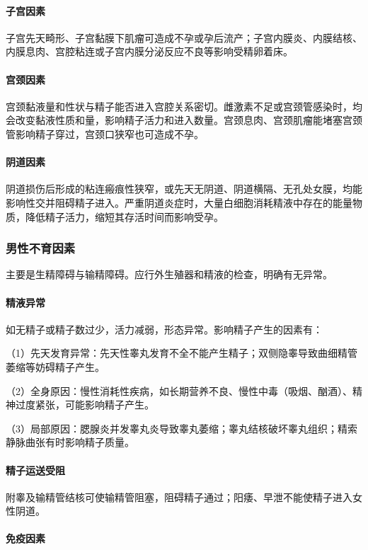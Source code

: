 \paragraph{子宫因素}

子宫先天畸形、子宫黏膜下肌瘤可造成不孕或孕后流产；子宫内膜炎、内膜结核、内膜息肉、宫腔粘连或子宫内膜分泌反应不良等影响受精卵着床。
\paragraph{宫颈因素}

宫颈黏液量和性状与精子能否进入宫腔关系密切。雌激素不足或宫颈管感染时，均会改变黏液性质和量，影响精子活力和进入数量。宫颈息肉、宫颈肌瘤能堵塞宫颈管影响精子穿过，宫颈口狭窄也可造成不孕。
\paragraph{阴道因素}

阴道损伤后形成的粘连瘢痕性狭窄，或先天无阴道、阴道横隔、无孔处女膜，均能影响性交并阻碍精子进入。严重阴道炎症时，大量白细胞消耗精液中存在的能量物质，降低精子活力，缩短其存活时间而影响受孕。

\subsubsection{男性不育因素}

主要是生精障碍与输精障碍。应行外生殖器和精液的检查，明确有无异常。
\paragraph{精液异常}

如无精子或精子数过少，活力减弱，形态异常。影响精子产生的因素有：

（1）先天发育异常：先天性睾丸发育不全不能产生精子；双侧隐睾导致曲细精管萎缩等妨碍精子产生。

（2）全身原因：慢性消耗性疾病，如长期营养不良、慢性中毒（吸烟、酗酒）、精神过度紧张，可能影响精子产生。

（3）局部原因：腮腺炎并发睾丸炎导致睾丸萎缩；睾丸结核破坏睾丸组织；精索静脉曲张有时影响精子质量。
\paragraph{精子运送受阻}

附睾及输精管结核可使输精管阻塞，阻碍精子通过；阳痿、早泄不能使精子进入女性阴道。
\paragraph{免疫因素}

